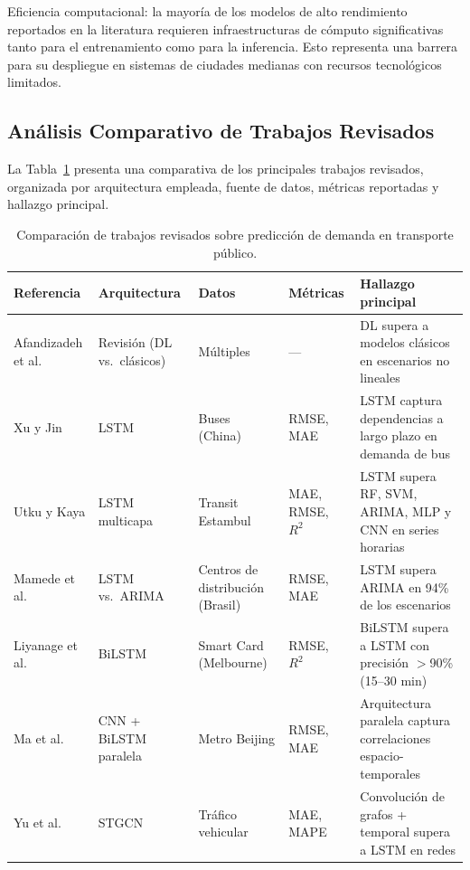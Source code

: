 \documentclass[preprint,12pt]{elsarticle}
\begin{document}
Eficiencia computacional: la mayoría de los modelos de alto rendimiento reportados en la literatura requieren infraestructuras de cómputo significativas tanto para el entrenamiento como para la inferencia. Esto representa una barrera para su despliegue en sistemas de ciudades medianas con recursos tecnológicos limitados.

\subsection{Análisis Comparativo de Trabajos Revisados}

La Tabla~\ref{tab:comparativo} presenta una comparativa de los principales trabajos revisados, organizada por arquitectura empleada, fuente de datos, métricas reportadas y hallazgo principal.

\begin{table}[htbp]
\centering
\caption{Comparación de trabajos revisados sobre predicción de demanda en transporte público.}
\label{tab:comparativo}
\small
\begin{tabular}{p{2.2cm} p{2cm} p{2.2cm} p{1.5cm} p{3.8cm}}
\toprule
\textbf{Referencia} & \textbf{Arquitectura} & \textbf{Datos} & \textbf{Métricas} & \textbf{Hallazgo principal} \\
\midrule
Afandizadeh et al.\ \cite{afandizadeh2024} & Revisión (DL vs.\ clásicos) & Múltiples & --- & DL supera a modelos clásicos en escenarios no lineales \\
\addlinespace
Xu y Jin \cite{xu2021} & LSTM & Buses (China) & RMSE, MAE & LSTM captura dependencias a largo plazo en demanda de bus \\
\addlinespace
Utku y Kaya \cite{utku2023} & LSTM multicapa & Transit Estambul & MAE, RMSE, $R^2$ & LSTM supera RF, SVM, ARIMA, MLP y CNN en series horarias \\
\addlinespace
Mamede et al.\ \cite{mamede2023} & LSTM vs.\ ARIMA & Centros de distribución (Brasil) & RMSE, MAE & LSTM supera ARIMA en 94\% de los escenarios \\
\addlinespace
Liyanage et al.\ \cite{liyanage2022} & BiLSTM & Smart Card (Melbourne) & RMSE, $R^2$ & BiLSTM supera a LSTM con precisión $>$90\% (15--30 min) \\
\addlinespace
Ma et al.\ \cite{ma2018} & CNN + BiLSTM paralela & Metro Beijing & RMSE, MAE & Arquitectura paralela captura correlaciones espacio-temporales \\
\addlinespace
Yu et al.\ \cite{yu2018} & STGCN & Tráfico vehicular & MAE, MAPE & Convolución de grafos + temporal supera a LSTM en redes \\

\end{tabular}
\end{table}
\end{document}
